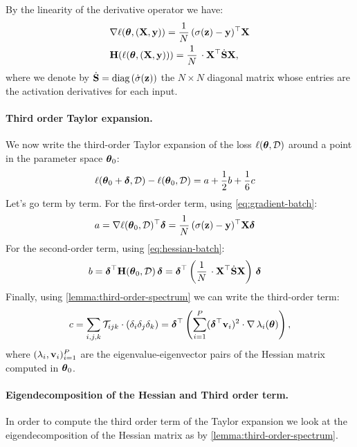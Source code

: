 \documentclass{article} %
\newcommand{\hessian}{\vH}
\begin{document}
By the linearity of the derivative operator we have: 
\begin{align}
\label{eq:gradient-batch}
    & \grad\loss(\vparam, (\vX, \vy)) = \frac{1}{N}\,(\sigma(\vz) - \vy)^\top \vX\\
\label{eq:hessian-batch}
    & \hessian(\loss(\vparam, (\vX, \vy))) = \frac{1}{N}\, \cdot \vX^\top\dot\vS \vX,
\end{align}
where we denote by $\dot{\mbox{$\mbox{$\mathbf{S}$}$}} = \mbox{diag}\left(\dot\sigma(\mbox{$\mbox{$\mathbf{z}$}$})\right)$ the $N\times N$ diagonal matrix whose entries are the activation derivatives for each input.

\paragraph{Third order Taylor expansion.}
We now write the third-order Taylor expansion of the loss $\ell(\mbox{$\mbox{$\boldsymbol{\theta}$}$}, \mbox{${\cal D}$})$ around a point in the parameter space $\mbox{$\mbox{$\boldsymbol{\theta}$}$}_0$: 
\begin{align}
\label{eq:Taylor-general-logistic}
    &\ell(\mbox{$\mbox{$\boldsymbol{\theta}$}$}_0 + \mbox{$\mbox{$\boldsymbol{\delta}$}$}, \mbox{${\cal D}$}) - \ell(\mbox{$\mbox{$\boldsymbol{\theta}$}$}_0, \mbox{${\cal D}$}) = a + \frac{1}{2} b + \frac{1}{6} c
\end{align}
Let's go term by term. For the first-order term, using \cref{eq:gradient-batch}: 
\begin{align}
\label{eq:Taylor-first-logistic}
    & a = \nabla\ell(\mbox{$\mbox{$\boldsymbol{\theta}$}$}_0, \mbox{${\cal D}$})^\top\mbox{$\mbox{$\boldsymbol{\delta}$}$} = \frac{1}{N}\,(\sigma(\mbox{$\mbox{$\mathbf{z}$}$}) - \mbox{$\mbox{$\mathbf{y}$}$})^\top \mbox{$\mbox{$\mathbf{X}$}$} \mbox{$\mbox{$\boldsymbol{\delta}$}$}
\end{align}
For the second-order term, using \cref{eq:hessian-batch}: 
\begin{align}
\label{eq:Taylor-second-logistic}
    & b = \vdelta^\top\hessian(\vparam_0, \data)\,\vdelta = \vdelta^\top \rnd{\frac{1}{N}\, \cdot \vX^\top  \dot\vS \vX}\,\vdelta
\end{align}
Finally, using \cref{lemma:third-order-spectrum} we can write the third-order term: 
\begin{align}
\label{eq:Taylor-third-logistic}
    c = \sum_{i,j,k}\mathcal{T}_{ijk}\cdot (\delta_i\delta_j\delta_k) = \mbox{$\mbox{$\boldsymbol{\delta}$}$}^\top \left(\sum_{i=1}^P (\mbox{$\mbox{$\boldsymbol{\delta}$}$}^\top \mbox{$\mbox{$\mathbf{v}$}$}_i)^2 \cdot \nabla\,\lambda_i(\mbox{$\mbox{$\boldsymbol{\theta}$}$})\right),
\end{align}
where $(\lambda_i, \mbox{$\mbox{$\mathbf{v}$}$}_i)_{i=1}^P$ are the eigenvalue-eigenvector pairs of the Hessian matrix computed in $\mbox{$\mbox{$\boldsymbol{\theta}$}$}_0$. 

\paragraph{Eigendecomposition of the Hessian and Third order term.} 
In order to compute the third order term of the Taylor expansion we look at the eigendecomposition of the Hessian matrix as by \cref{lemma:third-order-spectrum}. 
\end{document}
